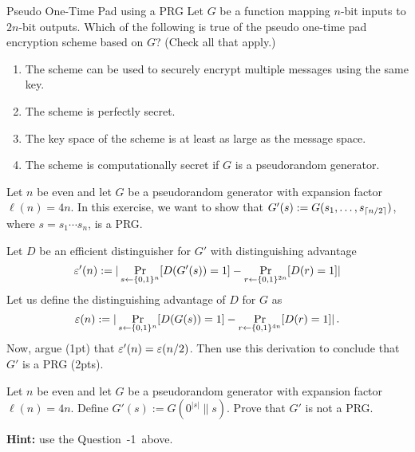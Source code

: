 \documentclass[a4paper,10pt]{article}
\begin{document}
\begin{solution}
\end{solution}


\begin{nquestion}{1}{Pseudo One-Time Pad using a PRG}
Let $G$ be a function mapping $n$-bit inputs to $2n$-bit outputs. Which of the following is true of the pseudo one-time pad encryption scheme based on $G$? (Check all that apply.)
\begin{enumerate}
\item The scheme can be used to securely encrypt multiple messages using the same key.
\item The scheme is perfectly secret.
\item The key space of the scheme is at least as large as the message space.
\item The scheme is computationally secret if $G$ is a pseudorandom generator.
\end{enumerate}
\end{nquestion}

\begin{solution}
\end{solution}

\begin{question}{3} \label{hardquestion}
Let $n$ be even and let $G$ be a pseudorandom generator with expansion factor $\ell(n)=4n$. In this exercise, we want to show that $G'(s) := G(s_1, \ldots, s_{\lceil n/2\rceil})$, where $s=s_1 \cdots s_n$, is a PRG.

Let $D$ be an efficient distinguisher for $G'$ with distinguishing advantage
\[
\varepsilon'(n) := | \Pr_{s \leftarrow \{0,1\}^n}[D(G'(s))=1] - \Pr_{r \leftarrow \{0,1\}^{2n}}[D(r)=1]|
\]
Let us define the distinguishing advantage of $D$ for $G$ as
\[
\varepsilon(n) := |\Pr_{s \leftarrow \{0,1\}^n}[D(G(s))=1]- \Pr_{r \leftarrow \{0,1\}^{4n}}[D(r)=1]| \, .
\]
Now, argue (1pt) that $\varepsilon'(n)=\varepsilon(n/2)$. Then use this derivation to conclude that $G'$ is a PRG (2pts).
\end{question}
\begin{solution}
\end{solution}

\begin{question}{2}
Let $n$ be even and let $G$  be a pseudorandom generator with expansion factor $\ell(n)=4n$.  Define $G'(s):=G(0^{|s|} \| s)$. Prove that $G'$ is not a PRG.

\noindent \textbf{Hint:} use the Question~\the\numexpr\value{questionnr}-1\relax\ above.
\end{question}
\begin{solution}
\end{solution}
\end{document}
